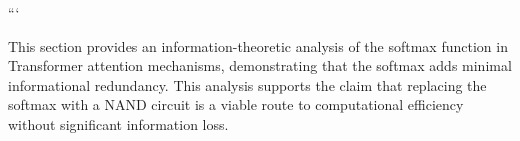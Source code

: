 





























```













This section provides an information-theoretic analysis of the softmax function in Transformer attention mechanisms, demonstrating that the softmax adds minimal informational redundancy. This analysis supports the claim that replacing the softmax with a NAND circuit is a viable route to computational efficiency without significant information loss.